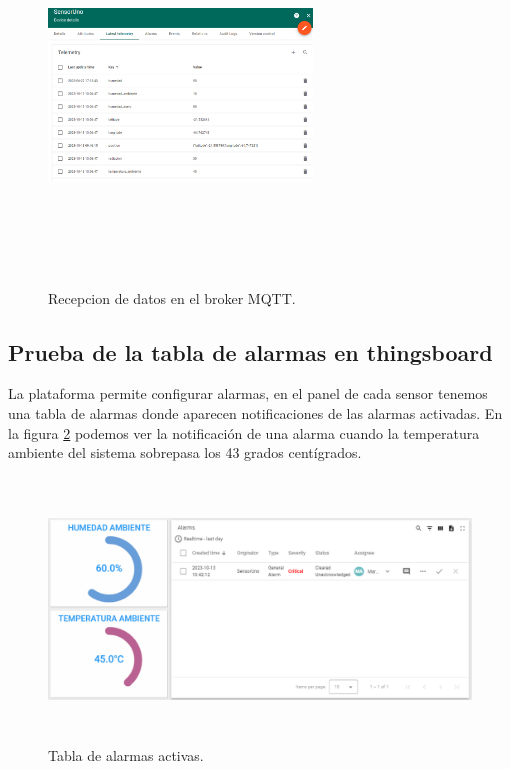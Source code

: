 \begin{figure}[h!]
  \centering
    \includegraphics[width=7cm, height=10cm]{./Figures/tb_recepcion.png}
  \caption{Recepcion de datos en el broker MQTT.}
    \label{fig:tb recepcion}
\end{figure}

\subsection{Prueba de la tabla de alarmas en thingsboard}
La plataforma permite configurar alarmas, en el panel de cada sensor tenemos una tabla de alarmas donde aparecen notificaciones de las alarmas activadas.
En la figura \ref{fig:alarmas tb} podemos ver la notificación de una alarma cuando la temperatura ambiente del sistema sobrepasa los 43 grados centígrados.

\begin{figure}[h!]
  \centering
    \includegraphics[width=\linewidth, height=7cm]{./Figures/alarmas_tb.png}
  \caption{Tabla de alarmas activas.}
    \label{fig:alarmas tb}
\end{figure}

